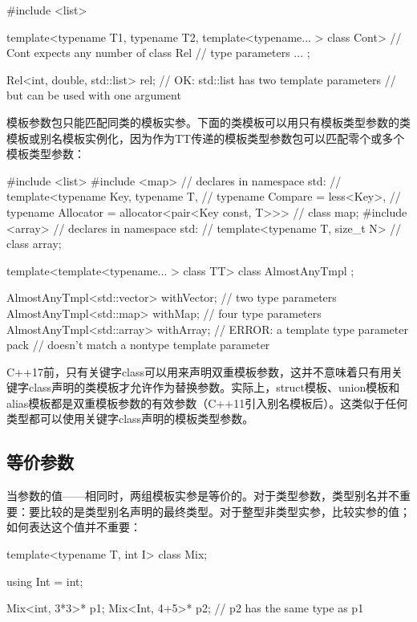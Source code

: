 \begin{cpp}
#include <list>

template<typename T1, typename T2,
		template<typename... > class Cont> // Cont expects any number of
class Rel { // type parameters
	...
};

Rel<int, double, std::list> rel; // OK: std::list has two template parameters
								// but can be used with one argument
\end{cpp}

模板参数包只能匹配同类的模板实参。下面的类模板可以用只有模板类型参数的类模板或别名模板实例化，因为作为TT传递的模板类型参数包可以匹配零个或多个模板类型参数：

\begin{cpp}
#include <list>
#include <map>
	// declares in namespace std:
	// template<typename Key, typename T,
	// typename Compare = less<Key>,
	// typename Allocator = allocator<pair<Key const, T>>>
	// class map;
#include <array>
	// declares in namespace std:
	// template<typename T, size_t N>
	// class array;
	
template<template<typename... > class TT>
class AlmostAnyTmpl {};

AlmostAnyTmpl<std::vector> withVector; // two type parameters
AlmostAnyTmpl<std::map> withMap; // four type parameters
AlmostAnyTmpl<std::array> withArray; // ERROR: a template type parameter pack
									// doesn't match a nontype template parameter
\end{cpp}

C++17前，只有关键字class可以用来声明双重模板参数，这并不意味着只有用关键字class声明的类模板才允许作为替换参数。实际上，struct模板、union模板和alias模板都是双重模板参数的有效参数（C++11引入别名模板后）。这类似于任何类型都可以使用关键字class声明的模板类型参数。

\subsection{等价参数}

当参数的值——相同时，两组模板实参是等价的。对于类型参数，类型别名并不重要：要比较的是类型别名声明的最终类型。对于整型非类型实参，比较实参的值；如何表达这个值并不重要：

\begin{cpp}
template<typename T, int I>
class Mix;

using Int = int;

Mix<int, 3*3>* p1;
Mix<Int, 4+5>* p2; // p2 has the same type as p1
\end{cpp}

